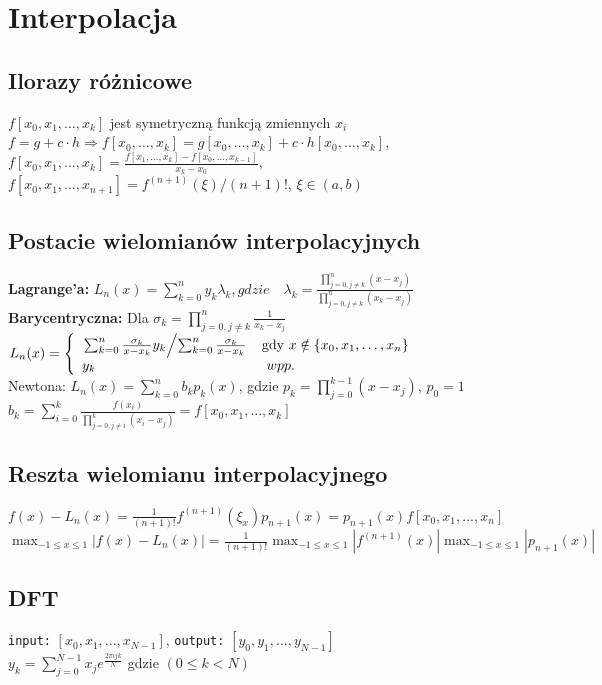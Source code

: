 \documentclass[a4paper,twocolumn]{article}
\begin{document}
\section{Interpolacja}
\subsection{Ilorazy różnicowe}
$f[x_0,x_1, \ldots, x_k]$ jest symetryczną funkcją zmiennych $x_i$\\ $f = g+c\cdot h \Rightarrow f[x_0,\ldots,x_k]=g[x_0,\ldots,x_k]+c\cdot h[x_0,\ldots,x_k]$,\\ $f[x_0, x_1,\ldots,x_k] = \frac{f[x_1,\ldots,x_k]-f[x_0,\ldots,x_{k-1}]}{x_k-x_0}$,\\
$f[x_0,x_1,\ldots,x_{n+1}] = f^{(n+1)}(\xi) / (n+1)!$, $\xi \in (a,b)$

\subsection{Postacie wielomianów interpolacyjnych}
\textbf{Lagrange'a:} $L_n(x) =\sum_{k=0}^ny_k
\lambda_k ,gdzie\quad \lambda_k=\frac{\prod_{j=0, j\neq k}^{n}(x-x_j)}{\prod_{j=0, j\neq k}^{n}(x_k-x_j)}$\\
\textbf{Barycentryczna:}
Dla $\sigma_k = \prod^n_{j=0, j\neq k}\frac{1}{x_k-x_j}$\\
$  L_n(x) = \left\{ \begin{array}{ll}
\left. \sum_{k=0}^n\frac{\sigma_k}{x-x_k}y_k \middle/ \sum_{k=0}^n\frac{\sigma_k}{x-x_k} \right. & \textrm{gdy $x \notin \left\{ x_0,x_1,\dots,x_n \right\} $}\\
y_k & \textrm{ $ wpp. $}
\end{array} \right.
$\\
Newtona: 
$ L_n(x) = \sum_{k=0}^n b_kp_k(x)$, gdzie $p_k = \prod_{j = 0}^{k-1} (x - x_j)$, $p_0 = 1$ \\
$b_k = \sum_{i = 0}^k \frac{f(x_i)}{\prod_{j = 0, j\neq i}^k (x_i - x_j)} = f[x_0, x_1, \ldots, x_k]$

\subsection{Reszta wielomianu interpolacyjnego}
$f(x)-L_n(x) = \frac{1}{(n+1)!}f^{(n+1)}(\xi_x)p_{n+1}(x) = p_{n+1}(x)f[x_0, x_1, ..., x_n]$\\
$\max_{-1\leq x \leq 1} | f(x)-L_n(x) | = \frac{1}{(n+1)!}\max_{-1\leq x \leq 1} | f^{(n+1)}(x) | \max_{-1\leq x \leq 1} | p_{n+1}(x) |$
\subsection{DFT}
\texttt{input:} $[x_0, x_1, ..., x_{N-1}]$, 
\texttt{output:} $[y_0, y_1, ..., y_{N-1}]$\\ 
${y_k = \sum_{j = 0}^{N-1} x_j e^{\frac{2 \pi i j k}{N}}} $ gdzie $ (0 \leqslant k < N)$
\end{document}
